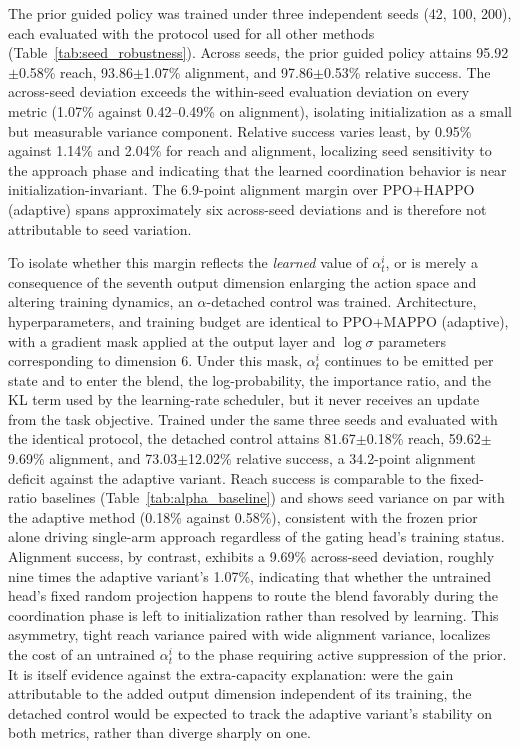The prior guided policy was trained under three independent seeds (42, 100, 200), each evaluated with the protocol used for
all other methods (Table~\ref{tab:seed_robustness}). Across seeds, the prior guided policy attains 95.92$\pm$0.58\% reach,
93.86$\pm$1.07\% alignment, and 97.86$\pm$0.53\% relative success. The across-seed deviation exceeds
the within-seed evaluation deviation on every metric (1.07\% against 0.42--0.49\% on alignment),
isolating initialization as a small but measurable variance component. Relative success varies least,
by 0.95\% against 1.14\% and 2.04\% for reach and alignment, localizing seed sensitivity to the
approach phase and indicating that the learned coordination behavior is near
initialization-invariant. The 6.9-point alignment margin over PPO+HAPPO (adaptive) spans
approximately six across-seed deviations and is therefore not attributable to seed variation.

To isolate whether this margin reflects the \emph{learned} value of $\alpha_t^i$, or is merely a
consequence of the seventh output dimension enlarging the action space and altering training
dynamics, an $\alpha$-detached control was trained. Architecture, hyperparameters, and training
budget are identical to PPO+MAPPO (adaptive), with a gradient mask applied at the output layer and
$\log\sigma$ parameters corresponding to dimension 6. Under this mask, $\alpha_t^i$ continues to be
emitted per state and to enter the blend, the log-probability, the importance ratio, and the KL term
used by the learning-rate scheduler, but it never receives an update from the task objective. Trained
under the same three seeds and evaluated with the identical protocol, the detached control attains
81.67$\pm$0.18\% reach, 59.62$\pm$9.69\% alignment, and 73.03$\pm$12.02\% relative success, a
34.2-point alignment deficit against the adaptive variant. Reach success is comparable to the
fixed-ratio baselines (Table~\ref{tab:alpha_baseline}) and shows seed variance on par with the
adaptive method (0.18\% against 0.58\%), consistent with the frozen prior alone driving single-arm
approach regardless of the gating head's training status. Alignment success, by contrast, exhibits a
9.69\% across-seed deviation, roughly nine times the adaptive variant's 1.07\%, indicating that
whether the untrained head's fixed random projection happens to route the blend favorably during the
coordination phase is left to initialization rather than resolved by learning. This asymmetry, tight
reach variance paired with wide alignment variance, localizes the cost of an untrained $\alpha_t^i$
to the phase requiring active suppression of the prior. It is itself evidence against the
extra-capacity explanation: were the gain attributable to the added output dimension independent of
its training, the detached control would be expected to track the adaptive variant's stability on
both metrics, rather than diverge sharply on one.

